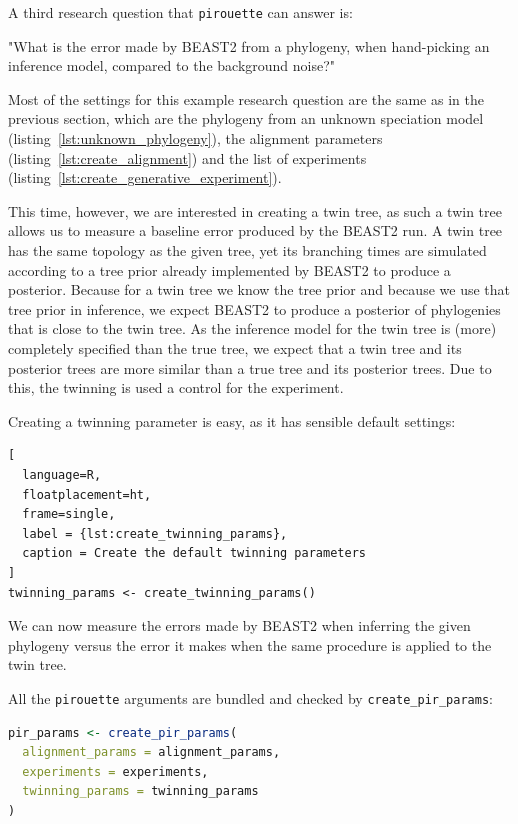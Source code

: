 \documentclass{article}
\begin{document}
A third research question that \verb;pirouette; can answer is:

"What is the error made by BEAST2 from a phylogeny, 
when hand-picking an inference model, compared to the background noise?"

Most of the settings for this example research question are
the same as in the previous section, which are
the phylogeny from an unknown speciation model (listing~\ref{lst:unknown_phylogeny}), 
the alignment parameters (listing~\ref{lst:create_alignment}) 
and the list of experiments (listing~\ref{lst:create_generative_experiment}).

This time, however, we are interested in creating a twin tree,
as such a twin tree allows us to measure a baseline error produced
by the BEAST2 run.
A twin tree
has the same topology as the given tree, 
yet its branching times are simulated according 
to a tree prior already implemented by BEAST2 to produce a posterior. 
Because for a twin tree we know the tree prior 
and because we use that tree prior in inference, 
we expect BEAST2 to produce a posterior of phylogenies
that is close to the twin tree.
As the inference model for the twin tree is (more) completely
specified than the true tree, 
we expect that a twin tree and its posterior trees are more similar
than a true tree and its posterior trees.
Due to this, the twinning is used a control for the experiment.

Creating a twinning parameter is easy, as it has sensible default settings:

\begin{lstlisting}[
  language=R, 
  floatplacement=ht, 
  frame=single,
  label = {lst:create_twinning_params},
  caption = Create the default twinning parameters
]
twinning_params <- create_twinning_params()
\end{lstlisting}

We can now measure the errors made by BEAST2 
when inferring the given phylogeny 
versus the error it makes when the same procedure is applied to the twin tree.

All the \verb;pirouette; arguments are bundled and checked by \verb;create_pir_params;:

\begin{lstlisting}[language=R, floatplacement=ht, frame=single]
pir_params <- create_pir_params(
  alignment_params = alignment_params,
  experiments = experiments,
  twinning_params = twinning_params
)
\end{lstlisting}
\end{document}
